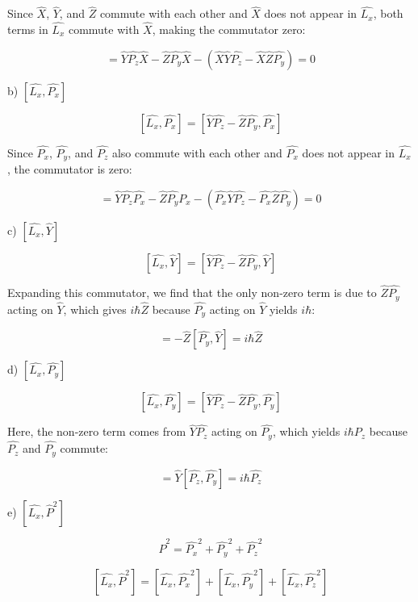 \documentclass[a4paper,11pt]{article}
\begin{document}
Since \( \hat{X} \), \( \hat{Y} \), and \( \hat{Z} \) commute with each other and \( \hat{X} \) does not appear in \( \hat{L_{x}} \), both terms in \( \hat{L_{x}} \) commute with \( \hat{X} \), making the commutator zero:

\[ = \hat{Y}\hat{P_{z}}\hat{X} - \hat{Z}\hat{P_{y}}\hat{X} - (\hat{X}\hat{Y}\hat{P_{z}} - \hat{X}\hat{Z}\hat{P_{y}}) = 0 \]

b) \( \left[ \hat{L_{x}}, \hat{P_{x}} \right] \)

\[ \left[ \hat{L_{x}}, \hat{P_{x}} \right] = \left[ \hat{Y}\hat{P_{z}} - \hat{Z}\hat{P_{y}}, \hat{P_{x}} \right] \]

Since \( \hat{P_{x}} \), \( \hat{P_{y}} \), and \( \hat{P_{z}} \) also commute with each other and \( \hat{P_{x}} \) does not appear in \( \hat{L_{x}} \), the commutator is zero:

\[ = \hat{Y}\hat{P_{z}}\hat{P_{x}} - \hat{Z}\hat{P_{y}}\hat{P_{x}} - (\hat{P_{x}}\hat{Y}\hat{P_{z}} - \hat{P_{x}}\hat{Z}\hat{P_{y}}) = 0 \]

c) \( \left[ \hat{L_{x}}, \hat{Y} \right] \)

\[ \left[ \hat{L_{x}}, \hat{Y} \right] = \left[ \hat{Y}\hat{P_{z}} - \hat{Z}\hat{P_{y}}, \hat{Y} \right] \]

Expanding this commutator, we find that the only non-zero term is due to \( \hat{Z}\hat{P_{y}} \) acting on \( \hat{Y} \), which gives \( i\hbar\hat{Z} \) because \( \hat{P_{y}} \) acting on \( \hat{Y} \) yields \( i\hbar \):

\[ = - \hat{Z} [ \hat{P_{y}}, \hat{Y} ] = i\hbar \hat{Z} \]

d) \( \left[ \hat{L_{x}}, \hat{P_{y}} \right] \)

\[ \left[ \hat{L_{x}}, \hat{P_{y}} \right] = \left[ \hat{Y}\hat{P_{z}} - \hat{Z}\hat{P_{y}}, \hat{P_{y}} \right] \]

Here, the non-zero term comes from \( \hat{Y}\hat{P_{z}} \) acting on \( \hat{P_{y}} \), which yields \( i\hbar\hat{P_{z}} \) because \( \hat{P_{z}} \) and \( \hat{P_{y}} \) commute:

\[ = \hat{Y} [ \hat{P_{z}}, \hat{P_{y}} ] = i\hbar \hat{P_{z}} \]

e) \( \left[ \hat{L_{x}}, \hat{P}^{2} \right] \)

\[ \hat{P}^{2} = \hat{P_{x}}^2 + \hat{P_{y}}^2 + \hat{P_{z}}^2 \]

\[ \left[ \hat{L_{x}}, \hat{P}^{2} \right] = \left[ \hat{L_{x}}, \hat{P_{x}}^2 \right] + \left[ \hat{L_{x}}, \hat{P_{y}}^2 \right] + \left[ \hat{L_{x}}, \hat{P_{z}}^2 \right] \]
\end{document}
